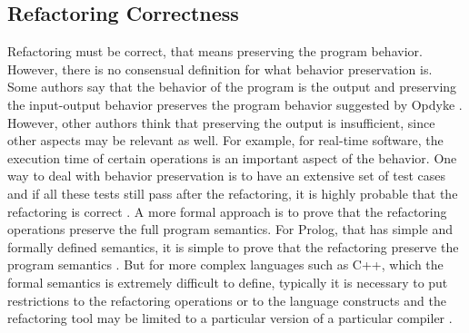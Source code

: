 

\subsection{Refactoring Correctness}
%
Refactoring must be correct, that means preserving the program behavior.
However, there is no consensual definition for what behavior preservation is.
Some authors say that the behavior of the program is the output and preserving the input-output behavior preserves the program behavior suggested by Opdyke \cite{opdyke1992refactoring}.
However, other authors think that preserving the output is insufficient, since other aspects may be relevant as well. For example, for real-time software, the execution time of certain operations is an important aspect of the behavior. 
One way to deal with behavior preservation is to have an extensive set of test cases and if all these tests still pass after the refactoring, it is highly probable that the refactoring is correct \cite{mens2004survey}.
A more formal approach is to prove that the refactoring operations preserve the full program semantics. For Prolog, that has simple and formally defined semantics, it is simple to prove that the refactoring preserve the program semantics \cite{proietti1991semantics}. %
But for more complex languages such as C++, which the formal semantics is extremely difficult to define, typically it is necessary to put restrictions to the refactoring operations or to the language constructs and the refactoring tool may be limited to a particular version of a particular compiler \cite{tokuda2001evolving}.%




